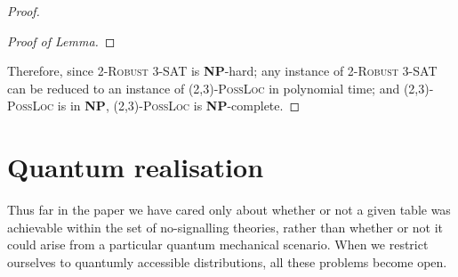 \documentclass[reprint]{revtex4-1}
\theoremstyle{definition}
\begin{document}
\begin{proof}
\begin{proof}[Proof of Lemma]



\end{proof}

Therefore, since \textsc{2-Robust 3-SAT} is \textbf{NP}-hard; any instance of \textsc{2-Robust 3-SAT} can be reduced to an instance of \textsc{(2,3)-PossLoc} in polynomial time; and \textsc{(2,3)-PossLoc} is in \textbf{NP}, \textsc{(2,3)-PossLoc} is \textbf{NP}-complete.
\end{proof}

\section{Quantum realisation}\label{QR}
Thus far in the paper we have cared only about whether or not a given table was achievable within the set of no-signalling theories, rather than whether or not it could arise from a particular quantum mechanical scenario. When we restrict ourselves to quantumly accessible distributions, all these problems become open.
\end{document}
